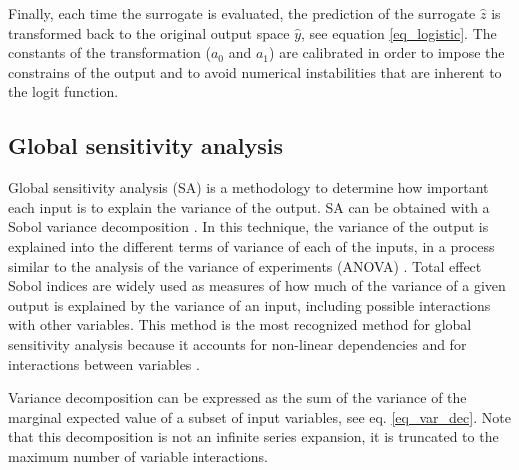 \documentclass[preprint,12pt]{elsarticle}
\begin{document}

Finally, each time the surrogate is evaluated, the prediction of the surrogate $\hat{z}$ is transformed back to the original output space $\hat{y}$, see equation \ref{eq_logistic}. The constants of the transformation ($a_0$ and $a_1$) are calibrated in order to impose the constrains of the output and to avoid numerical instabilities that are inherent to the logit function.



\subsection{Global sensitivity analysis}

Global sensitivity analysis (SA) is a methodology to determine how important each input is to explain the variance of the output. SA can be obtained with a Sobol variance decomposition \cite{sobol2001global}. In this technique, the variance of the output is explained into the different terms of variance of each of the inputs, in a process similar to the analysis of the variance of experiments (ANOVA) \cite{maxwell2004designing}. Total effect Sobol indices are widely used as measures of how much of the variance of a given output is explained by the variance of an input, including possible interactions with other variables. This method is the most recognized method for global sensitivity analysis because it accounts for non-linear dependencies and for interactions between variables \cite{saltelli2010variance}.

Variance decomposition can be expressed as the sum of the variance of the marginal expected value of a subset of input variables, see eq. \ref{eq_var_dec}. Note that this decomposition is not an infinite series expansion, it is truncated to the maximum number of variable interactions.

\end{document}
